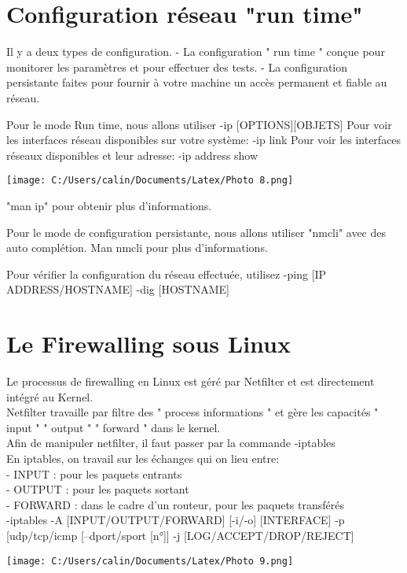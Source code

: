 \documentclass[11pt,a4peper]{article}
\begin{document}
\section{Configuration réseau "run time"}

Il y a deux types de configuration.
- La configuration " run time " conçue pour monitorer les paramètres et pour effectuer des tests.
- La configuration persistante faites pour fournir à votre machine un accès permanent et fiable au réseau.

Pour le mode Run time, nous allons utiliser -ip [OPTIONS][OBJETS]
Pour voir les interfaces réseau disponibles sur votre système: -ip link
Pour voir les interfaces réseaux disponibles et leur adresse: -ip address show

\texttt{[image: C:/Users/calin/Documents/Latex/Photo 8.png]} 

"man ip" pour obtenir plus d'informations.

Pour le mode de configuration persistante, nous allons utiliser "nmcli" avec des auto complétion.
Man nmcli pour plus d'informations.

Pour vérifier la configuration du réseau effectuée, utilisez 
-ping [IP ADDRESS/HOSTNAME]
-dig [HOSTNAME]

\section{Le Firewalling sous Linux}

Le processus de firewalling en Linux est géré par Netfilter et est directement intégré au Kernel.\\
Netfilter travaille par filtre des " process informations " et gère les capacités " input " " output " " forward " dans le kernel.\\
Afin de manipuler netfilter, il faut passer par la commande -iptables\\
En iptables, on travail sur les échanges qui on lieu entre:\\
- INPUT : pour les paquets entrants\\
- OUTPUT : pour les paquets sortant\\
- FORWARD : dans le cadre d’un routeur, pour les paquets transférés\\
-iptables -A [INPUT/OUTPUT/FORWARD] [-i/-o] [INTERFACE] -p [udp/tcp/icmp [--dport/sport [n°]] -j [LOG/ACCEPT/DROP/REJECT]

\texttt{[image: C:/Users/calin/Documents/Latex/Photo 9.png]} 
\end{document}
